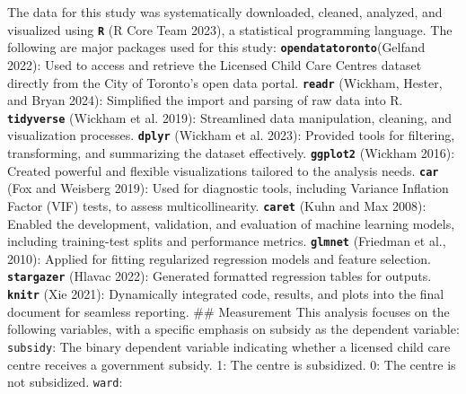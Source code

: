 \documentclass[
  letterpaper,
  DIV=11,
  numbers=noendperiod]{scrartcl}
\begin{document}
The data for this study was systematically downloaded, cleaned,
analyzed, and visualized using \textbf{\texttt{R}} (R Core Team 2023), a
statistical programming language. The following are major packages used
for this study: \textbf{\texttt{opendatatoronto}}(Gelfand 2022): Used to
access and retrieve the Licensed Child Care Centres dataset directly
from the City of Toronto's open data portal. \textbf{\texttt{readr}}
(Wickham, Hester, and Bryan 2024): Simplified the import and parsing of
raw data into R. \textbf{\texttt{tidyverse}} (Wickham et al. 2019):
Streamlined data manipulation, cleaning, and visualization processes.
\textbf{\texttt{dplyr}} (Wickham et al. 2023): Provided tools for
filtering, transforming, and summarizing the dataset effectively.
\textbf{\texttt{ggplot2}} (Wickham 2016): Created powerful and flexible
visualizations tailored to the analysis needs. \textbf{\texttt{car}}
(Fox and Weisberg 2019): Used for diagnostic tools, including Variance
Inflation Factor (VIF) tests, to assess multicollinearity.
\textbf{\texttt{caret}} (Kuhn and Max 2008): Enabled the development,
validation, and evaluation of machine learning models, including
training-test splits and performance metrics. \textbf{\texttt{glmnet}}
(Friedman et al., 2010): Applied for fitting regularized regression
models and feature selection. \textbf{\texttt{stargazer}} (Hlavac 2022):
Generated formatted regression tables for outputs.
\textbf{\texttt{knitr}} (Xie 2021): Dynamically integrated code,
results, and plots into the final document for seamless reporting. \#\#
Measurement This analysis focuses on the following variables, with a
specific emphasis on subsidy as the dependent variable:
\texttt{subsidy}: The binary dependent variable indicating whether a
licensed child care centre receives a government subsidy. 1: The centre
is subsidized. 0: The centre is not subsidized. \texttt{ward}:
\end{document}
